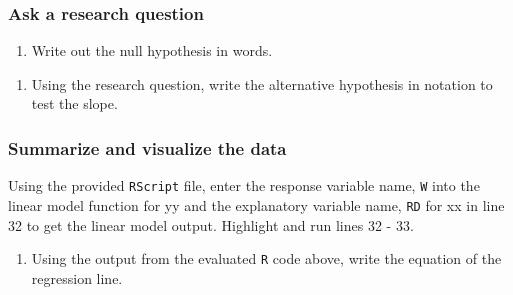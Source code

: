 \documentclass[
]{report}
\newenvironment{Shaded}{\begin{snugshade}}{\end{snugshade}}
\newcommand{\CommentTok}[1]{\textcolor[rgb]{0.56,0.35,0.01}{\textit{#1}}}
\newcommand{\DataTypeTok}[1]{\textcolor[rgb]{0.13,0.29,0.53}{#1}}
\newcommand{\DecValTok}[1]{\textcolor[rgb]{0.00,0.00,0.81}{#1}}
\newcommand{\KeywordTok}[1]{\textcolor[rgb]{0.13,0.29,0.53}{\textbf{#1}}}
\newcommand{\NormalTok}[1]{#1}
\newcommand{\OperatorTok}[1]{\textcolor[rgb]{0.81,0.36,0.00}{\textbf{#1}}}
\newcommand{\StringTok}[1]{\textcolor[rgb]{0.31,0.60,0.02}{#1}}
\providecommand{\tightlist}{%
  \setlength{\itemsep}{0pt}\setlength{\parskip}{0pt}}
\begin{document}
\hypertarget{ask-a-research-question-4}{%
\subsubsection*{Ask a research question}\label{ask-a-research-question-4}}

\begin{enumerate}
\def\labelenumi{\arabic{enumi}.}
\setcounter{enumi}{5}
\tightlist
\item
  Write out the null hypothesis in words.
\end{enumerate}

\vspace{1in}

\begin{enumerate}
\def\labelenumi{\arabic{enumi}.}
\setcounter{enumi}{6}
\tightlist
\item
  Using the research question, write the alternative hypothesis in notation to test the slope.
\end{enumerate}

\vspace{0.5in}

\hypertarget{summarize-and-visualize-the-data-4}{%
\subsubsection*{Summarize and visualize the data}\label{summarize-and-visualize-the-data-4}}

Using the provided \texttt{RScript} file, enter the response variable name, \texttt{W} into the linear model function for yy and the explanatory variable name, \texttt{RD} for xx in line 32 to get the linear model output. Highlight and run lines 32 - 33.

\begin{Shaded}
\end{Shaded}

\begin{enumerate}
\def\labelenumi{\arabic{enumi}.}
\setcounter{enumi}{7}
\tightlist
\item
  Using the output from the evaluated \texttt{R} code above, write the equation of the regression line.
\end{enumerate}
\end{document}
